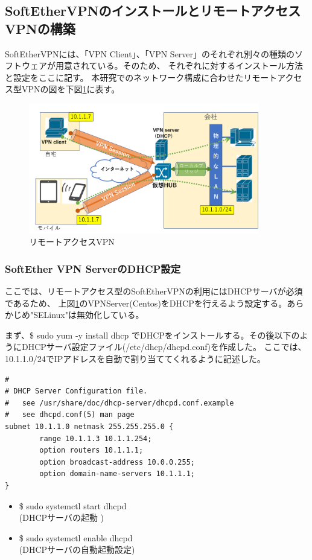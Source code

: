 \documentclass[11pt,a4j,titlepage]{jreport}
\begin{document}
\subsection*{SoftEtherVPNのインストールとリモートアクセスVPNの構築}
SoftEtherVPNには、「VPN Client」、「VPN Server」のそれぞれ別々の種類のソフトウェアが用意されている。そのため、
それぞれに対するインストール方法と設定をここに記す。
本研究でのネットワーク構成に合わせたリモートアクセス型VPNの図を下図\ref{softether}に表す。

\begin{figure}[H]
    \centering
    \includegraphics*[width=0.9\textwidth,page=2]{graphs/softetherVPN.pdf}
    \caption{リモートアクセスVPN}
    \label{softether}
\end{figure}
\subsubsection*{SoftEther VPN ServerのDHCP設定}
ここでは、リモートアクセス型のSoftEtherVPNの利用にはDHCPサーバが必須であるため、
上図\ref{softether}のVPNServer(Centos)をDHCPを行えるよう設定する。あらかじめ"SELinux"は無効化している。\par
まず、\$ sudo yum -y install dhcp でDHCPをインストールする。その後以下のようにDHCPサーバ設定ファイル(/etc/dhcp/dhcpd.conf)を作成した。
ここでは、10.1.1.0/24でIPアドレスを自動で割り当ててくれるように記述した。
\begin{lstlisting}
#
# DHCP Server Configuration file.
#   see /usr/share/doc/dhcp-server/dhcpd.conf.example
#   see dhcpd.conf(5) man page
subnet 10.1.1.0 netmask 255.255.255.0 {
        range 10.1.1.3 10.1.1.254;
        option routers 10.1.1.1;
        option broadcast-address 10.0.0.255;
        option domain-name-servers 10.1.1.1;
} 

\end{lstlisting}
\begin{itemize}
    \setlength{\parskip}{0.0cm} %
    \setlength{\itemsep}{0.0cm} 
    \item \$ sudo systemctl start dhcpd \\(DHCPサーバの起動 )
    \item \$ sudo systemctl enable dhcpd \\(DHCPサーバの自動起動設定)
\end{itemize}
\end{document}
